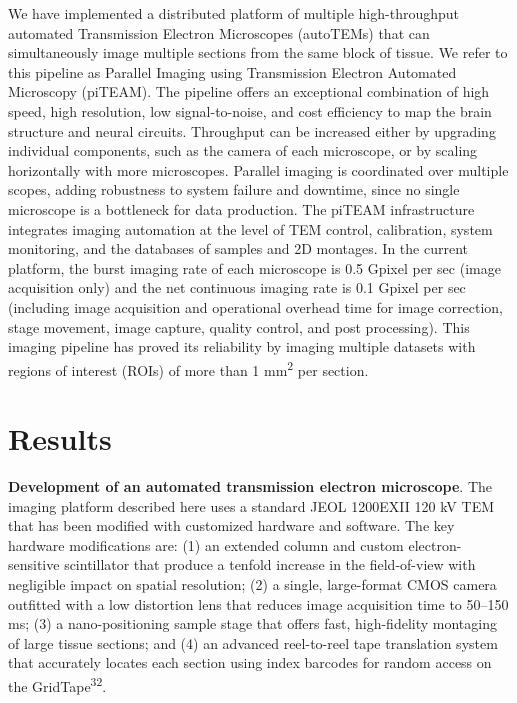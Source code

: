 \documentclass{article}
\begin{document}
We have implemented a distributed platform of multiple high-throughput automated Transmission Electron Microscopes (autoTEMs) that can simultaneously image multiple sections from the same block of tissue. We refer to this pipeline as Parallel Imaging using Transmission Electron Automated Microscopy (piTEAM). The pipeline offers an exceptional combination of high speed, high resolution, low signal-to-noise, and cost efficiency to map the brain structure and neural circuits. Throughput can be increased either by upgrading individual components, such as the camera of each microscope, or by scaling horizontally with more microscopes. Parallel imaging is coordinated over multiple scopes, adding robustness to system failure and downtime, since no single microscope is a bottleneck for data production. The piTEAM infrastructure integrates imaging automation at the level of TEM control, calibration, system monitoring, and the databases of samples and 2D montages. In the current platform, the burst imaging rate of each microscope is 0.5 Gpixel per sec (image acquisition only) and the net continuous imaging rate is 0.1 Gpixel per sec (including image acquisition and operational overhead time for image correction, stage movement, image capture, quality control, and post processing). This imaging pipeline has proved its reliability by imaging multiple datasets with regions of interest (ROIs) of more than 1 mm\textsuperscript{2} per section.

\section*{Results}

\noindent\textbf{Development of an automated transmission electron microscope}. The imaging platform described here uses a standard JEOL 1200EXII 120 kV TEM that has been modified with customized hardware and software. The key hardware modifications are: (1) an extended column and custom electron-sensitive scintillator that produce a tenfold increase in the field-of-view with negligible impact on spatial resolution; (2) a single, large-format CMOS camera outfitted with a low distortion lens that reduces image acquisition time to 50–150 ms; (3) a nano-positioning sample stage that offers fast, high-fidelity montaging of large tissue sections; and (4) an advanced reel-to-reel tape translation system that accurately locates each section using index barcodes for random access on the GridTape\textsuperscript{32}.
\end{document}

